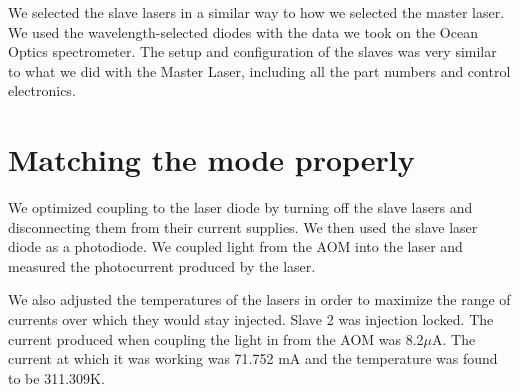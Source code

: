 We selected the slave lasers in a similar way to how we selected the master laser. We used the wavelength-selected diodes with the data we took on the Ocean Optics spectrometer. The setup and configuration of the slaves was very similar to what we did with the Master Laser, including all the part numbers and control electronics.



\section{Matching the mode properly}
We optimized coupling to the laser diode by turning off the slave lasers and disconnecting them from their current supplies. We then used the slave laser diode as a photodiode. We coupled light from the AOM into the laser and measured the photocurrent produced by the laser.

We also adjusted the temperatures of the lasers in order to maximize the range of currents over which they would stay injected. Slave 2 was injection locked. The current produced when coupling the light in from the AOM was 8.2$\mu$A. The current at which it was working was 71.752 mA %
and the temperature was found to be 311.309K. %

